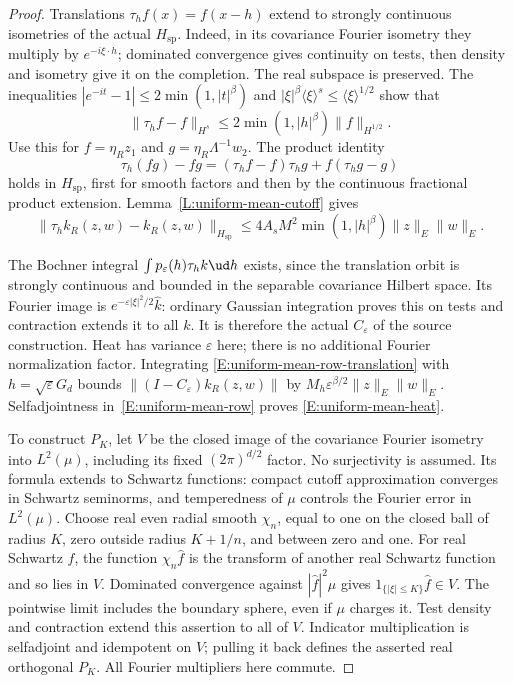 \begin{proof}
  Translations $\tau_hf(x)=f(x-h)$ extend to strongly continuous
  isometries of the actual $H_{\mathrm{sp}}$.
  Indeed, in its covariance Fourier isometry they multiply by
  $e^{-i\xi\cdot h}$; dominated convergence gives continuity
  on tests, then density and isometry give it on the completion.
  The real subspace is preserved.
  The inequalities $|e^{-it}-1|\le2\min(1,|t|^\beta)$ and
  $|\xi|^\beta\langle\xi\rangle^s\le\langle\xi\rangle^{1/2}$
  show that
  \[
    \|\tau_hf-f\|_{H^s}
    \le2\min(1,|h|^\beta)\|f\|_{H^{1/2}} .
  \]
  Use this for $f=\eta_Rz_1$ and $g=\eta_R\Lambda^{-1}w_2$.
  The product identity
  \[
    \tau_h(fg)-fg=(\tau_hf-f)\tau_hg+f(\tau_hg-g)
  \]
  holds in $H_{\mathrm{sp}}$, first for smooth factors and
  then by the continuous fractional product extension.
  Lemma~\ref{L:uniform-mean-cutoff} gives
  \begin{equation}\label{E:uniform-mean-row-translation}
    \|\tau_hk_R(z,w)-k_R(z,w)\|_{H_{\mathrm{sp}}}
    \le4A_sM^2\min(1,|h|^\beta)\|z\|_E\|w\|_E .
  \end{equation}

  The Bochner integral $\int p_\varepsilon(h)\tau_hk\ud h$
  exists, since the translation orbit is strongly continuous
  and bounded in the separable covariance Hilbert space.
  Its Fourier image is $e^{-\varepsilon|\xi|^2/2}\widehat k$:
  ordinary Gaussian integration proves this on tests and
  contraction extends it to all $k$.
  It is therefore the actual $C_\varepsilon$ of the source construction.
  Heat has variance $\varepsilon$ here; there is no additional
  Fourier normalization factor. Integrating
  \eqref{E:uniform-mean-row-translation} with
  $h=\sqrt\varepsilon G_d$ bounds
  $\|(I-C_\varepsilon)k_R(z,w)\|$ by
  $M_h\varepsilon^{\beta/2}\|z\|_E\|w\|_E$.
  Selfadjointness in~\eqref{E:uniform-mean-row} proves
  \eqref{E:uniform-mean-heat}.

  To construct $P_K$, let $V$ be the closed image of the covariance
  Fourier isometry into $L^2(\mu)$, including its fixed
  $(2\pi)^{d/2}$ factor. No surjectivity is assumed.
  Its formula extends to Schwartz functions: compact cutoff
  approximation converges in Schwartz seminorms, and temperedness
  of $\mu$ controls the Fourier error in $L^2(\mu)$.
  Choose real even radial smooth $\chi_n$, equal to one on
  the closed ball of radius $K$, zero outside radius $K+1/n$,
  and between zero and one.
  For real Schwartz $f$, the function $\chi_n\widehat f$ is
  the transform of another real Schwartz function and so lies in $V$.
  Dominated convergence against $|\widehat f|^2\mu$ gives
  $1_{\{|\xi|\le K\}}\widehat f\in V$.
  The pointwise limit includes the boundary sphere, even if
  $\mu$ charges it. Test density and contraction extend this
  assertion to all of $V$.
  Indicator multiplication is selfadjoint and idempotent on $V$;
  pulling it back defines the asserted real orthogonal $P_K$.
  All Fourier multipliers here commute.


\end{proof}
